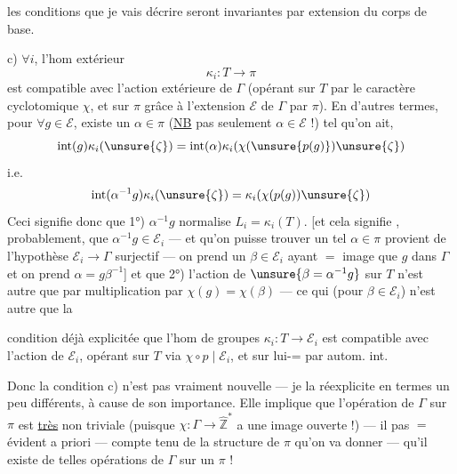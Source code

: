 
les conditions que je vais décrire seront invariantes par extension du corps de base.


c) \(\forall i\), l'hom extérieur
\[
\kappa_i:T\longrightarrow\pi
\]
est compatible avec l'action extérieure de \(\Gamma\) (opérant sur \(T\) par le
caractère cyclotomique \(\chi\), et sur \(\pi\) grâce à l'extension \(\mathcal E\)
de \(\Gamma\) par \(\pi\)). En d'autres termes, pour \(\forall g\in\mathcal E\),
existe un \uline{\(\alpha\in\pi\)} (\uline{NB} pas seulement
\(\alpha\in\mathcal E\) !) tel qu'on ait,
\[
\operatorname{int}(g)\kappa_i(\unsure{\zeta})
=\operatorname{int}(\alpha)\kappa_i(\chi(\unsure{p(g)})\unsure{\zeta})
\]
i.e.
\[
\operatorname{int}(\alpha^{-1}g)\kappa_i(\unsure{\zeta})
=\kappa_i(\chi(p(g))\unsure{\zeta})
\]
Ceci signifie donc que 1°) \(\alpha^{-1}g\) normalise \(L_i=\kappa_i(T)\).
[et cela signifie \unsure{\(=\)}, probablement, que \(\alpha^{-1}g\in\mathcal E_i\)
--- et qu'on puisse trouver un tel \(\alpha\in\pi\)
 provient de l'hypothèse
\(\mathcal E_i\to\Gamma\) surjectif --- on prend un \(\beta\in\mathcal E_i\)
 ayant \(=\) image que \(g\) dans \(\Gamma\)
et on prend \(\alpha=g\beta^{-1}\)] et que 2°) l'action  de
\(\unsure{\beta=\alpha^{-1}g}\) sur \(T\) n'est autre que par multiplication
par \(\chi(g)=\chi(\beta)\) --- ce qui (pour \(\beta\in\mathcal E_i\)) n'est autre que la



condition déjà explicitée que l'hom de groupes \(\kappa_i:T\to\mathcal E_i\)
est compatible avec l'action de \(\mathcal E_i\), opérant sur \(T\) via
\(\chi\circ p\mid\mathcal E_i\), et sur lui-= par autom. int.

Donc la condition c) n'est pas vraiment nouvelle --- je la réexplicite en termes
un peu différents, à cause de son importance. Elle implique que l'opération
de \(\Gamma\) sur \(\pi\) est \uline{très} non triviale (puisque
\(\chi:\Gamma\to\widehat{\mathbb Z}^{*}\) a une image ouverte !)
--- il  pas \(=\) évident a priori
 --- compte tenu de la structure
de \(\pi\) qu'on va donner --- qu'il existe de telles opérations de \(\Gamma\)
sur un \(\pi\) !

